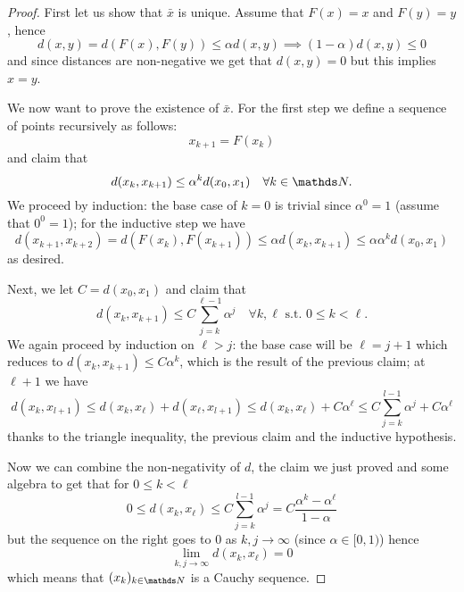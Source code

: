 \documentclass[12pt]{extarticle}
\numberwithin{equation}{section}
\begin{document}
\begin{proof}
    First let us show that $\bar x$ is unique.
    Assume that $F(x) = x$ and $F(y) = y$, hence
    \begin{equation}
        d(x, y) = d(F(x), F(y)) \leq \alpha d(x, y) \implies (1-\alpha) d(x, y) \leq 0
    \end{equation}
    and since distances are non-negative we get that $d(x, y) = 0$ but this implies $x = y$.

    We now want to prove the existence of $\bar x$.
    For the first step we define a sequence of points recursively as follows:
    \begin{equation}
        x_{k + 1} = F(x_k)
    \end{equation}
    and claim that
    \begin{equation}
        d(x_k, x_{k+1}) \leq \alpha^k d(x_0, x_1) \quad \forall k \in \N .
    \end{equation}
    We proceed by induction: the base case of $k = 0$ is trivial since $\alpha^0 = 1$ (assume that $0^0=1$);
    for the inductive step we have
    \begin{equation}
        d(x_{k+1}, x_{k+2}) = d(F(x_k), F(x_{k+1})) \leq \alpha d(x_k, x_{k+1}) \leq \alpha \alpha^k d(x_0, x_1)
    \end{equation}
    as desired.

    Next, we let $C = d(x_0, x_1)$ and claim that
    \begin{equation}
        d(x_k, x_{k+1}) \leq C \sum_{j = k}^{\ell-1} \alpha^j \quad \forall k, \ell \text{ s.t. } 0 \leq k < \ell.
    \end{equation}
    We again proceed by induction on $\ell > j$:
    the base case will be $\ell = j + 1$ which reduces to $d(x_k, x_{k+1}) \leq C \alpha^k$, which is the result of the previous claim;
    at $\ell + 1$ we have
    \begin{equation}
        d(x_k, x_{l+1}) \leq d(x_k, x_\ell) + d(x_\ell, x_{l + 1}) \leq d(x_k, x_\ell) + C \alpha^\ell \leq C\sum_{j = k}^{l-1} \alpha^j + C \alpha^\ell
    \end{equation}
    thanks to the triangle inequality, the previous claim and the inductive hypothesis.

    Now we can combine the non-negativity of $d$, the claim we just proved and some algebra to get that for $0 \leq k < \ell$
    \begin{equation}
        0 \leq d(x_k, x_\ell) \leq C \sum_{j = k}^{l-1} \alpha^j = C \frac{\alpha^k - \alpha^\ell}{1-\alpha}
    \end{equation}
    but the sequence on the right goes to $0$ as $k, j \to \infty$ (since $\alpha \in [0, 1)$) hence
    \begin{equation}
        \lim_{k, j \to \infty} d(x_k, x_{\ell}) = 0
    \end{equation}
    which means that $(x_k)_{k \in \N}$ is a Cauchy sequence.


\end{proof}
\end{document}
